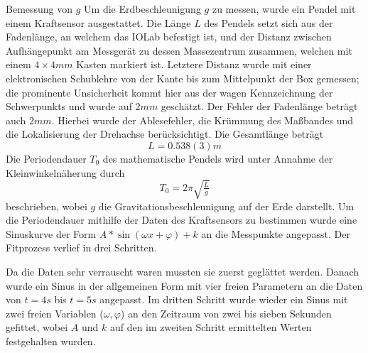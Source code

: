 \documentclass{alex_gp}
\begin{document}
\begin{mybox}{Bemessung von \( g \)}
	Um die Erdbeschleunigung \( g \) zu messen, wurde ein Pendel mit einem Kraftsensor ausgestattet. Die Länge \( L \) des Pendels setzt sich aus der Fadenlänge, an welchem das IOLab befestigt ist, und der Distanz zwischen Aufhängepunkt am Messgerät zu dessen Massezentrum zusammen, welchen mit einem \( 4\times 4 \unit{mm} \) Kasten markiert ist. Letztere Distanz wurde mit einer elektronischen Schublehre von der Kante bis zum Mittelpunkt der Box gemessen; die prominente Unsicherheit kommt hier aus der wagen Kennzeichnung der Schwerpunkts und wurde auf \( 2 \unit{mm} \) geschätzt. Der Fehler der Fadenlänge beträgt auch \( 2 \unit{mm} \). Hierbei wurde der Ablesefehler, die Krümmung des Maßbandes und die Lokalisierung der Drehachse berücksichtigt. Die Gesamtlänge beträgt 
	\begin{equation}
		L = 0.538(3) \unit{m}
	\end{equation}
	Die Periodendauer \( T_0 \) des mathematische Pendels wird unter Annahme der Kleinwinkelnäherung durch 
	\begin{equation}\label{eqn:T0}
		T_0 = 2\pi\sqrt{\tfrac{L}{g}}
	\end{equation}
	beschrieben, wobei \( g \) die Gravitationsbeschleunigung auf der Erde darstellt. Um die Periodendauer mithilfe der Daten des Kraftsensors zu bestimmen wurde eine Sinuskurve der Form \( A * \sin(\omega x + \varphi) + k \) an die Messpunkte angepasst. Der Fitprozess verlief in drei Schritten.\par 
	
	Da die Daten sehr verrauscht waren mussten sie zuerst geglättet werden. Danach wurde ein Sinus in der allgemeinen Form mit vier freien Parametern an die Daten von \( t = 4 \unit{s} \) bis \( t = 5 \unit{s} \) angepasst. Im dritten Schritt wurde wieder ein Sinus mit zwei freien Variablen (\( \omega, \varphi \)) an den Zeitraum von zwei bis sieben Sekunden gefittet, wobei \( A \) und \( k \) auf den im zweiten Schritt ermittelten Werten festgehalten wurden. \par 
	

\end{mybox}
\end{document}
